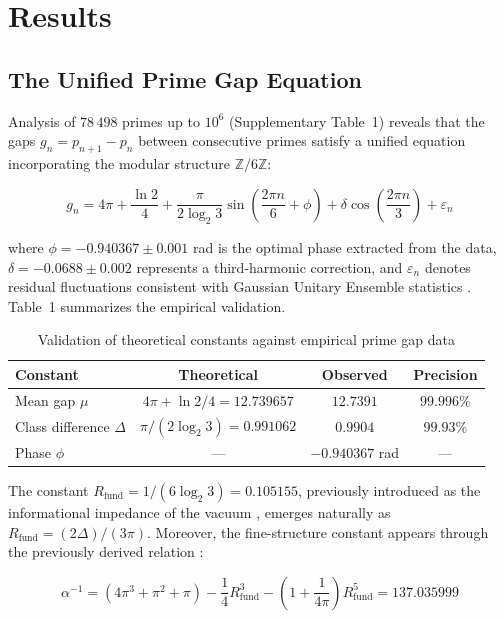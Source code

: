 \documentclass[pdflatex,sn-nature]{sn-jnl}
\theoremstyle{thmstyleone}
\theoremstyle{thmstyletwo}
\theoremstyle{thmstylethree}
\newcommand{\Zmod}{\mathbb{Z}/6\mathbb{Z}}
\newcommand{\Rfund}{R_{\text{fund}}}
\begin{document}
\section*{Results}

\subsection*{The Unified Prime Gap Equation}

Analysis of $78\,498$ primes up to $10^6$ (Supplementary Table~1) reveals that the gaps $g_n = p_{n+1}-p_n$ between consecutive primes satisfy a unified equation incorporating the modular structure $\Zmod$:

\begin{equation}
\boxed{g_n = 4\pi + \frac{\ln 2}{4} + \frac{\pi}{2\log_2 3}\sin\left(\frac{2\pi n}{6} + \phi\right) + \delta\cos\left(\frac{2\pi n}{3}\right) + \varepsilon_n}
\label{eq:unified}
\end{equation}

where $\phi = -0.940367 \pm 0.001$ rad is the optimal phase extracted from the data, $\delta = -0.0688 \pm 0.002$ represents a third-harmonic correction, and $\varepsilon_n$ denotes residual fluctuations consistent with Gaussian Unitary Ensemble statistics \cite{Montgomery1973}. Table~1 summarizes the empirical validation.

\begin{table}[h]
\caption{Validation of theoretical constants against empirical prime gap data}
\label{tab:validation}
\begin{tabular}{lccc}
\toprule
\textbf{Constant} & \textbf{Theoretical} & \textbf{Observed} & \textbf{Precision} \\
\midrule
Mean gap $\mu$ & $4\pi + \ln 2/4 = 12.739657$ & $12.7391$ & $99.996\%$ \\
Class difference $\Delta$ & $\pi/(2\log_2 3) = 0.991062$ & $0.9904$ & $99.93\%$ \\
Phase $\phi$ & — & $-0.940367$ rad & — \\
\bottomrule
\end{tabular}
\end{table}

The constant $\Rfund = 1/(6\log_2 3) = 0.105155$, previously introduced as the informational impedance of the vacuum \cite{PeinadorGenesis}, emerges naturally as $\Rfund = (2\Delta)/(3\pi)$. Moreover, the fine-structure constant appears through the previously derived relation \cite{PeinadorGenesis}:

\begin{equation}
\alpha^{-1} = (4\pi^3 + \pi^2 + \pi) - \frac{1}{4}\Rfund^3 - \left(1+\frac{1}{4\pi}\right)\Rfund^5 = 137.035999
\label{eq:alpha}
\end{equation}
\end{document}
